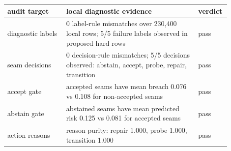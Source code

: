 \begin{tabular}{p{0.25\linewidth}p{0.56\linewidth}p{0.09\linewidth}}
\toprule
audit target & local diagnostic evidence & verdict \\
\midrule
diagnostic labels & 0 label-rule mismatches over 230,400 local rows; 5/5 failure labels observed in proposed hard rows & pass \\
seam decisions & 0 decision-rule mismatches; 5/5 decisions observed: abstain, accept, probe, repair, transition & pass \\
accept gate & accepted seams have mean breach 0.076 vs 0.108 for non-accepted seams & pass \\
abstain gate & abstained seams have mean predicted risk 0.125 vs 0.081 for accepted seams & pass \\
action reasons & reason purity: repair 1.000, probe 1.000, transition 1.000 & pass \\
\bottomrule
\end{tabular}
